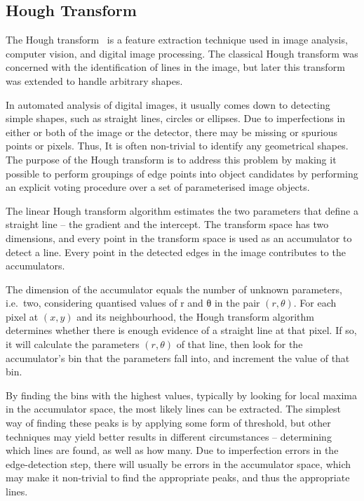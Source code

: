 \documentclass[fleqn,usenatbib]{rasti}
\begin{document}
\subsection{Hough Transform}
The Hough transform~\citep{osti_4746348} is a feature extraction technique used
in image analysis, computer vision, and digital image processing. The classical Hough
transform was concerned with the identification of lines in the image, but later this
transform was extended to handle arbitrary shapes.

In automated analysis of digital images, it usually comes down to detecting
simple shapes, such as straight lines, circles or ellipses. Due to imperfections
in either or both of the image or the detector, there may be missing or spurious
points or pixels. Thus, It is often non-trivial to identify any geometrical shapes.
The purpose of the Hough transform is to address this problem by making it
possible to perform groupings of edge points into object candidates by performing
an explicit voting procedure over a set of parameterised image objects.

The linear Hough transform algorithm estimates the two parameters that define a
straight line -- the gradient and the intercept. The transform space has two
dimensions, and every point in the transform space is used as an accumulator to
detect a line. Every point in the detected edges in the image contributes to the
accumulators.

The dimension of the accumulator equals the number of unknown parameters,
i.e.\ two, considering quantised values of r and θ in the pair $(r, \theta)$. For
each pixel at $(x, y)$ and its neighbourhood, the Hough transform algorithm
determines whether there is enough evidence of a straight line at that pixel. If so,
it will calculate the parameters $(r, \theta)$ of that line, then look for the
accumulator's bin that the parameters fall into, and increment the value of that
bin.

By finding the bins with the highest values, typically by looking for local maxima
in the accumulator space, the most likely lines can be extracted. The simplest way
of finding these peaks is by applying some form of threshold, but other techniques
may yield better results in different circumstances -- determining which lines are
found, as well as how many. Due to imperfection errors in the edge-detection step,
there will usually be errors in the accumulator space, which may make it non-trivial
to find the appropriate peaks, and thus the appropriate lines.
\end{document}
